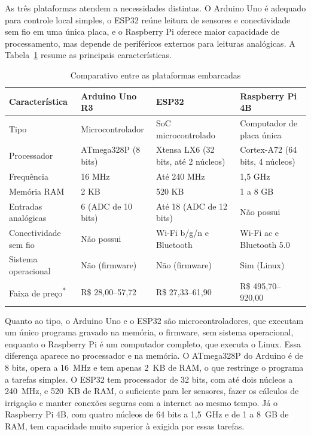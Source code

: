 As três plataformas atendem a necessidades distintas. O Arduino Uno é adequado para controle local simples, o ESP32 reúne leitura de sensores e conectividade sem fio em uma única placa, e o Raspberry Pi oferece maior capacidade de processamento, mas depende de periféricos externos para leituras analógicas. A Tabela~\ref{tab:comparativo-plataformas} resume as principais características.

\begin{table}[htbp]
  \centering
  \caption{Comparativo entre as plataformas embarcadas}
  \label{tab:comparativo-plataformas}
  \small
  \begin{tabular}{p{3.2cm} p{3.4cm} p{3.4cm} p{3.4cm}}
    \hline
    \textbf{Característica} & \textbf{Arduino Uno R3} & \textbf{ESP32} & \textbf{Raspberry Pi 4B} \\
    \hline
    Tipo & Microcontrolador & SoC microcontrolado & Computador de placa única \\
    Processador & ATmega328P (8 bits) & Xtensa LX6 (32 bits, até 2 núcleos) & Cortex-A72 (64 bits, 4 núcleos) \\
    Frequência & 16 MHz & Até 240 MHz & 1,5 GHz \\
    Memória RAM & 2 KB & 520 KB & 1 a 8 GB \\
    Entradas analógicas & 6 (ADC de 10 bits) & Até 18 (ADC de 12 bits) & Não possui \\
    Conectividade sem fio & Não possui & Wi-Fi b/g/n e Bluetooth & Wi-Fi ac e Bluetooth 5.0 \\
    Sistema operacional & Não (firmware) & Não (firmware) & Sim (Linux) \\
    Faixa de preço\textsuperscript{*} & R\$ 28,00--57,72 & R\$ 27,33--61,90 & R\$ 495,70--920,00 \\
    \hline
  \end{tabular}
\end{table}

Quanto ao tipo, o Arduino Uno e o ESP32 são microcontroladores, que executam um único programa gravado na memória, o firmware, sem sistema operacional, enquanto o Raspberry Pi é um computador completo, que executa o Linux. Essa diferença aparece no processador e na memória. O ATmega328P do Arduino é de 8 bits, opera a 16~MHz e tem apenas 2~KB de RAM, o que restringe o programa a tarefas simples. O ESP32 tem processador de 32 bits, com até dois núcleos a 240~MHz, e 520~KB de RAM, o suficiente para ler sensores, fazer os cálculos de irrigação e manter conexões seguras com a internet ao mesmo tempo. Já o Raspberry Pi 4B, com quatro núcleos de 64 bits a 1,5~GHz e de 1 a 8~GB de RAM, tem capacidade muito superior à exigida por essas tarefas.

